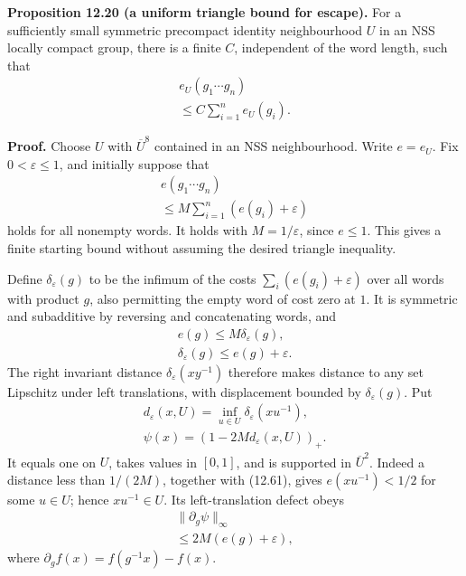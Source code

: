 \documentclass[
  11pt,
]{article}
\begin{document}
\textbf{Proposition 12.20 (a uniform triangle bound for escape).} For a
sufficiently small symmetric precompact identity neighbourhood \(U\) in
an NSS locally compact group, there is a finite \(C\), independent of
the word length, such that \[
\begin{gathered}
e_U(g_1\cdots g_n)\\
\leq C\sum_{i=1}^n e_U(g_i).
\end{gathered}
\tag{12.59}
\]

\textbf{Proof.} Choose \(U\) with \(\overline U^8\) contained in an NSS
neighbourhood. Write \(e=e_U\). Fix \(0<\varepsilon\leq1\), and
initially suppose that \[
\begin{gathered}
e(g_1\cdots g_n)\\
\leq M\sum_{i=1}^n(e(g_i)+\varepsilon)
\end{gathered}
\tag{12.60}
\] holds for all nonempty words. It holds with \(M=1/\varepsilon\),
since \(e\leq1\). This gives a finite starting bound without assuming
the desired triangle inequality.

Define \(\delta_\varepsilon(g)\) to be the infimum of the costs
\(\sum_i(e(g_i)+\varepsilon)\) over all words with product \(g\), also
permitting the empty word of cost zero at \(1\). It is symmetric and
subadditive by reversing and concatenating words, and \[
\begin{gathered}
e(g)\leq M\delta_\varepsilon(g),\\
\delta_\varepsilon(g)\leq e(g)+\varepsilon.
\end{gathered}
\tag{12.61}
\] The right invariant distance \(\delta_\varepsilon(xy^{-1})\)
therefore makes distance to any set Lipschitz under left translations,
with displacement bounded by \(\delta_\varepsilon(g)\). Put \[
\begin{gathered}
d_\varepsilon(x,U)=
       \inf_{u\in U}\delta_\varepsilon(xu^{-1}),\\
\psi(x)=(1-2M d_\varepsilon(x,U))_+.
\end{gathered}
\tag{12.62}
\] It equals one on \(U\), takes values in \([0,1]\), and is supported
in \(\overline U^2\). Indeed a distance less than \(1/(2M)\), together
with (12.61), gives \(e(xu^{-1})<1/2\) for some \(u\in U\); hence
\(xu^{-1}\in U\). Its left-translation defect obeys \[
\begin{gathered}
\|\partial_g\psi\|_\infty\\
\leq2M(e(g)+\varepsilon),
\end{gathered}
\tag{12.63}
\] where \(\partial_g f(x)=f(g^{-1}x)-f(x)\).
\end{document}
